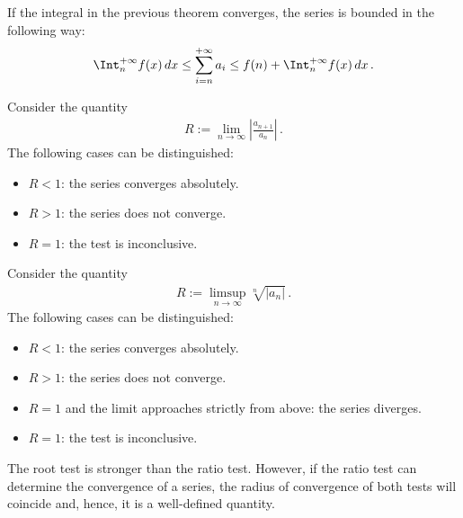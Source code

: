     \begin{property}
        If the integral in the previous theorem converges, the series is bounded in the following way:
        \begin{gather}
            \Int_n^{+\infty} f(x)\,dx\leq\sum_{i=n}^{+\infty} a_i \leq f(n) + \Int_n^{+\infty} f(x)\,dx\,.
        \end{gather}
    \end{property}

    \begin{method}
        Consider the quantity
        \begin{gather}
            R := \lim_{n\rightarrow\infty}\left|\frac{a_{n+1}}{a_n}\right|\,.
        \end{gather}
        The following cases can be distinguished:
        \begin{itemize}
            \item $R<1$: the series converges absolutely.
            \item $R>1$: the series does not converge.
            \item $R=1$: the test is inconclusive.
        \end{itemize}
    \end{method}

    \begin{method}
        Consider the quantity
        \begin{gather}
            R := \limsup_{n\rightarrow\infty}\sqrt[n]{|a_n|}\,.
        \end{gather}
        The following cases can be distinguished:
        \begin{itemize}
            \item $R<1$: the series converges absolutely.
            \item $R>1$: the series does not converge.
            \item $R=1$ and the limit approaches strictly from above: the series diverges.
            \item $R=1$: the test is inconclusive.
        \end{itemize}
    \end{method}
    \begin{remark}
        The root test is stronger than the ratio test. However, if the ratio test can determine the convergence of a series, the radius of convergence of both tests will coincide and, hence, it is a well-defined quantity.
    \end{remark}

